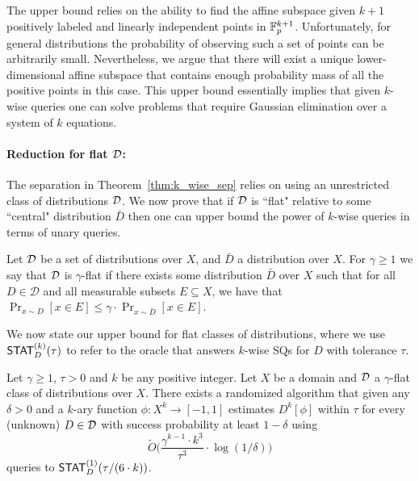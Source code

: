 The upper bound relies on the ability to find the affine subspace given $k+1$ positively labeled and linearly independent points in $\mathbb{F}_p^{k+1}$.  Unfortunately, for general distributions the probability of observing such a set of points can be arbitrarily small. Nevertheless, we argue that there will exist a unique lower-dimensional affine subspace that contains enough probability mass of all the positive points in this case. This upper bound essentially implies that given $k$-wise queries one can solve problems that require Gaussian elimination over a system of $k$ equations.

\paragraph{Reduction for flat $\mathcal{D}$:}\label{subsec:intro_flat}
The separation in Theorem~\ref{thm:k_wise_sep} relies on using an unrestricted class of distributions $\mathcal{D}$. We now prove that if $\mathcal{D}$ is ``flat" relative to some ``central" distribution $\bar{D}$ then one can upper bound the power of $k$-wise queries in terms of unary queries.


\begin{defn}
Let $\mathcal{D}$ be a set of distributions over $X$, and $\bar{D}$ a distribution over $X$. For $\gamma \geq 1$ we say that $\mathcal{D}$ is $\gamma$-flat if there exists some distribution $\bar{D}$ over $X$ such that for all $D \in \mathcal{D}$ and all measurable subsets $E \subseteq X$, we have that $\Pr_{x\sim D}[x \in E] \le \gamma \cdot \Pr_{x\sim \bar{D}}[x \in E]$.
\end{defn}

We now state our upper bound for flat classes of distributions, where we use $\mathsf{STAT}_D^{(k)}(\tau)$ to refer to the oracle that answers $k$-wise SQs for $D$ with tolerance $\tau$.
\begin{theorem}\label{thm:flat}
Let $\gamma \geq 1$, $\tau > 0$ and $k$ be any positive integer. Let $X$ be a domain and $\mathcal{D}$ a $\gamma$-flat class of distributions over $X$. There exists a randomized algorithm that given any $\delta > 0$ and a $k$-ary function $\phi: X^k \to [-1,1]$ estimates $D^k[\phi]$ within $\tau$  for every (unknown) $D \in \mathcal{D}$ with success probability at least $1-\delta$ using $$\tilde{O}\bigg( \frac{\gamma^{k-1} \cdot k^3}{\tau^3} \cdot \log (1/\delta)\bigg)$$
queries to $\mathsf{STAT}_D^{(1)}(\tau/(6 \cdot k))$.\end{theorem}

